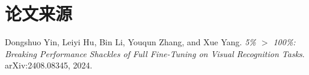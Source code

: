 \documentclass[UTF8,12pt,a4paper,fontset=none]{ctexart}
\begin{document}
\section*{论文来源}
Dongshuo Yin, Leiyi Hu, Bin Li, Youqun Zhang, and Xue Yang. \textit{5\% $>$ 100\%: Breaking Performance Shackles of Full Fine-Tuning on Visual Recognition Tasks}. arXiv:2408.08345, 2024.
\end{document}
